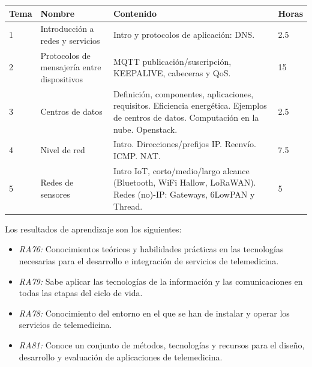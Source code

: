 \documentclass[xcolor=table,xcolor=x11names]{beamer}
\begin{document}
\begin{frame}{\subsecname}
    \begin{table}
        \centering
        \small
        \begin{tabular}{p{.8cm} | p{3.25cm} | p{4.7cm} | p{.8cm} }
            \toprule
            \textbf{Tema} & \textbf{Nombre} & \textbf{Contenido} & \textbf{Horas} \\ \midrule
            \rowcolor{upmblue!20} 1 &  Introducción a redes y servicios & Intro y protocolos de aplicación: DNS. & 2.5\\
            2 & Protocolos de mensajería entre dispositivos & MQTT publicación/suscripción, KEEPALIVE, cabeceras y QoS. & 15\\
            \rowcolor{upmblue!20}3 & Centros de datos & Definición, componentes, aplicaciones, requisitos. Eficiencia energética. Ejemplos de centros de datos.  Computación en la nube. Openstack. & 2.5\\
            4 & Nivel de red & Intro. Direcciones/prefijos IP. Reenvío. ICMP. NAT. & 7.5\\
            \rowcolor{upmblue!20}5 &  Redes de sensores  & Intro IoT, corto/medio/largo alcance (Bluetooth, WiFi Hallow, LoRaWAN). Redes (no)-IP: Gateways, 6LowPAN y Thread. & 5\\ \bottomrule
        \end{tabular}
    \end{table}
\end{frame}





\begin{frame}{\subsecname}
    Los resultados de aprendizaje son los siguientes:
    \begin{itemize}
        \item \emph{RA76:} Conocimientos teóricos y habilidades prácticas en las tecnologías necesarias para el desarrollo e
        integración de servicios de telemedicina.
        \item \emph{RA79:} Sabe aplicar las tecnologías de la información y las comunicaciones en todas las etapas del ciclo de vida.
        \item \emph{RA78:} Conocimiento del entorno en el que se han de instalar y operar los servicios de telemedicina.

        \item \emph{RA81:} Conoce un conjunto de métodos, tecnologías y recursos para el diseño, desarrollo y evaluación de
aplicaciones de telemedicina.
    \end{itemize}
\end{frame}
\end{document}
